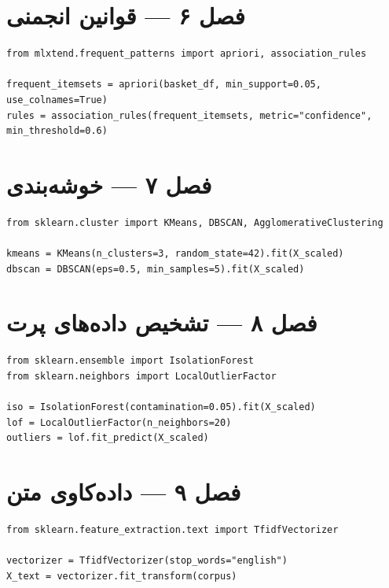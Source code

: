\section{فصل ۶ — قوانین انجمنی}
\begin{lstlisting}
from mlxtend.frequent_patterns import apriori, association_rules

frequent_itemsets = apriori(basket_df, min_support=0.05, use_colnames=True)
rules = association_rules(frequent_itemsets, metric="confidence", min_threshold=0.6)
\end{lstlisting}

\section{فصل ۷ — خوشه‌بندی}
\begin{lstlisting}
from sklearn.cluster import KMeans, DBSCAN, AgglomerativeClustering

kmeans = KMeans(n_clusters=3, random_state=42).fit(X_scaled)
dbscan = DBSCAN(eps=0.5, min_samples=5).fit(X_scaled)
\end{lstlisting}

\section{فصل ۸ — تشخیص داده‌های پرت}
\begin{lstlisting}
from sklearn.ensemble import IsolationForest
from sklearn.neighbors import LocalOutlierFactor

iso = IsolationForest(contamination=0.05).fit(X_scaled)
lof = LocalOutlierFactor(n_neighbors=20)
outliers = lof.fit_predict(X_scaled)
\end{lstlisting}

\section{فصل ۹ — داده‌کاوی متن}
\begin{lstlisting}
from sklearn.feature_extraction.text import TfidfVectorizer

vectorizer = TfidfVectorizer(stop_words="english")
X_text = vectorizer.fit_transform(corpus)
\end{lstlisting}
